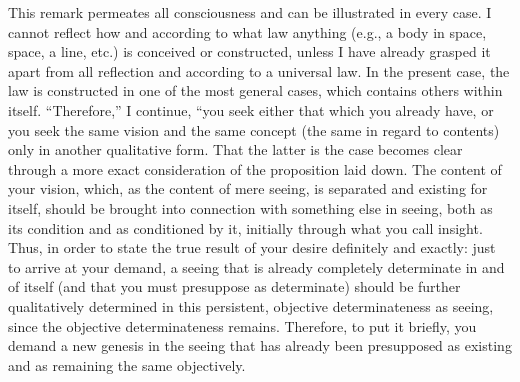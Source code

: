 This remark permeates all consciousness
and can be illustrated in every case.
I cannot reflect how and according to what law anything
(e.g., a body in space, space, a line, etc.)
is conceived or constructed,
unless I have already grasped it apart from all reflection
and according to a universal law.
In the present case, the law is constructed in
one of the most general cases,
which contains others within itself.
“Therefore,” I continue, “you seek either
that which you already have,
or you seek the same vision and the same concept
(the same in regard to contents)
only in another qualitative form.
That the latter is the case becomes clear
through a more exact consideration of the proposition laid down.
The content of your vision, which, as the content of
mere seeing, is separated and existing for itself,
should be brought into connection with something else in seeing,
both as its condition and as conditioned by it,
initially through what you call insight.
Thus, in order to state the true result of
your desire definitely and exactly:
just to arrive at your demand,
a seeing that is already completely determinate in and of itself
(and that you must presuppose as determinate)
should be further qualitatively determined
in this persistent, objective determinateness as seeing,
since the objective determinateness remains.
Therefore, to put it briefly,
you demand a new genesis in the seeing
that has already been presupposed as existing
and as remaining the same objectively.

